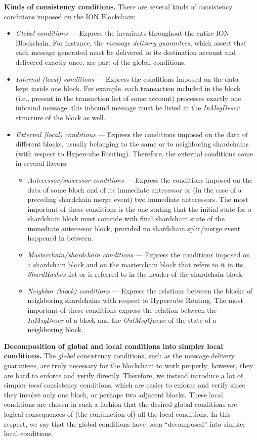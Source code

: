 \documentclass[12pt,oneside]{article}
\def\makepoint#1{\medbreak\noindent{\bf #1.\ }}
\def\nxsubpoint{\refstepcounter{subsubsection}%
  \smallbreak\makepoint{\thesubsubsection}}
\def\emb#1{\textbf{#1.}}
\begin{document}
\nxsubpoint\emb{Kinds of consistency conditions}
There are several kinds of consistency conditions imposed on the ION Blockchain:
\begin{itemize}
\item {\em Global conditions} --- Express the invariants throughout the entire ION Blockchain. For instance, the {\em message delivery guarantees}, which assert that each message generated must be delivered to its destination account and delivered exactly once, are part of the global conditions.
\item {\em Internal (local) conditions} --- Express the conditions imposed on the data kept inside one block. For example, each transaction included in the block (i.e., present in the transaction list of some account) processes exactly one inbound message; this inbound message must be listed in the {\em InMsgDescr\/} structure of the block as well.
\item {\em External (local) conditions} --- Express the conditions imposed on the data of different blocks, usually belonging to the same or to neighboring shardchains (with respect to Hypercube Routing). Therefore, the external conditions come in several flavors:
  \begin{itemize}
  \item {\em Antecessor/successor conditions} --- Express the conditions imposed on the data of some block and of its immediate antecessor or (in the case of a preceding shardchain merge event) two immediate antecessors. The most important of these conditions is the one stating that the initial state for a shardchain block must coincide with final shardchain state of the immediate antecessor block, provided no shardchain split/merge event happened in between.
  \item {\em Masterchain/shardchain conditions} --- Express the conditions imposed on a shardchain block and on the masterchain block that refers to it in its {\em ShardHashes\/} list or is referred to in the header of the shardchain block.
  \item {\em Neighbor (block) conditions} --- Express the relations between the blocks of neighboring shardchains with respect to Hypercube Routing. The most important of these conditions express the relation between the {\em InMsgDescr\/} of a block and the {\em OutMsgQueue\/} of the state of a neighboring block.
  \end{itemize}
\end{itemize}

\nxsubpoint\emb{Decomposition of global and local conditions into simpler local conditions}
The {\em global\/} consistency conditions, such as the message delivery guarantees, are truly necessary for the blockchain to work properly; however, they are hard to enforce and verify directly. Therefore, we instead introduce a lot of simpler {\em local\/} consistency conditions, which are easier to enforce and verify since they involve only one block, or perhaps two adjacent blocks. These local conditions are chosen in such a fashion that the desired global conditions are logical consequences of (the conjunction of) all the local conditions. In this respect, we say that the global conditions have been ``decomposed'' into simpler local conditions.
\end{document}
